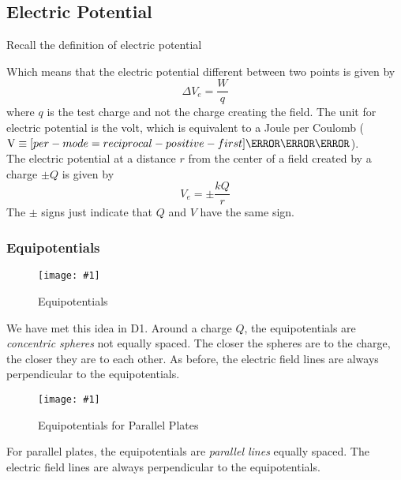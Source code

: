 \documentclass[a4paper,12pt]{article}
\let\oldsi\si
\renewcommand{\si}[1]{\oldsi[per-mode=reciprocal-positive-first]{#1}}
\newcommand{\lb}{\\[8pt]}
\newcommand{\img}[4]{\begin{center}
  \begin{figure}[H]
    \centering
    \texttt{[image: \#1]}
    \caption{#3}
    \label{fig:#4}
  \end{figure}
\end{center}}
\begin{document}
\pagebreak

\subsection{Electric Potential}

Recall the definition of electric potential
\begin{center}
\end{center}
Which means that the electric potential different between two points is given by
\begin{equation}\label{eq:potential}
  \Delta V_e = \frac{W}{q}
\end{equation}
where $q$ is the test charge and not the charge creating the field.
The unit for electric potential is the volt, which is equivalent to a Joule per Coulomb ($\text{V} \equiv \si{\J\per\C}$).\lb
The electric potential at a distance $r$ from the center of a field created by a charge $\pm Q$ is given by
\begin{equation}\label{eq:potential__}
  V_e = \pm \frac{kQ}{r}
\end{equation}
The $\pm$ signs just indicate that $Q$ and $V$ have the same sign.

\subsubsection{Equipotentials}

\begin{minipage}{0.45\textwidth}
  \img{sphereequipotential.png}{1}{Equipotentials}{sphereequipotential}

  We have met this idea in D1. Around a charge $Q$, the equipotentials are \textit{concentric spheres} not equally spaced. The closer the spheres are to the charge, the closer they are to each other. As before, the electric field lines are always perpendicular to the equipotentials.
\end{minipage}\hspace*{0.1\textwidth}
\begin{minipage}{0.45\textwidth}
  \img{platesequipotential.png}{1}{Equipotentials for Parallel Plates}{platesequipotential}

  For parallel plates, the equipotentials are \textit{parallel lines} equally spaced. The electric field lines are always perpendicular to the equipotentials.
\end{minipage}
\end{document}
